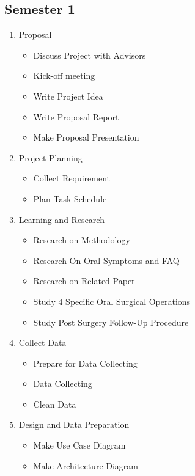 \documentclass[12pt,oneside,openright,a4paper]{cpe-english-project}
\begin{document}
    \subsection{Semester 1}
      \begin{enumerate}
        \item Proposal
          \begin{itemize}
            \item Discuss Project with Advisors
            \item Kick-off meeting
            \item Write Project Idea
            \item Write Proposal Report
            \item Make Proposal Presentation          
          \end{itemize}
        \item Project Planning
          \begin{itemize}
            \item Collect Requirement
            \item Plan Task Schedule          
          \end{itemize}
        \item Learning and Research
          \begin{itemize}
            \item Research on Methodology
            \item Research On Oral Symptoms and FAQ
            \item Research on Related Paper
            \item Study 4 Specific Oral Surgical Operations
            \item Study Post Surgery Follow-Up Procedure
          \end{itemize}
        \item Collect Data
          \begin{itemize}
            \item Prepare for Data Collecting
            \item Data Collecting
            \item Clean Data                 
          \end{itemize}
        \item Design and Data Preparation
          \begin{itemize}
            \item Make Use Case Diagram
            \item Make Architecture Diagram

\end{itemize}
\end{enumerate}
\end{document}
